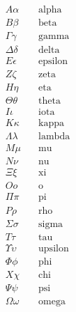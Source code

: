 \documentclass[11pt]{report}
\theoremstyle{definition}
\begin{document}
\[
	\begin{split}
		A        \alpha   & \quad \text{alpha}   \\
		B        \beta    & \quad \text{beta}    \\
		\Gamma   \gamma   & \quad \text{gamma}   \\
		\Delta   \delta   & \quad \text{delta}   \\
		E        \epsilon & \quad \text{epsilon} \\
		Z        \zeta    & \quad \text{zeta}    \\
		H        \eta     & \quad \text{eta}     \\
		\Theta   \theta   & \quad \text{theta}   \\
		I        \iota    & \quad \text{iota}    \\
		K        \kappa   & \quad \text{kappa}   \\
		\Lambda  \lambda  & \quad \text{lambda}  \\
		M        \mu      & \quad \text{mu}      \\
		N        \nu      & \quad \text{nu}      \\
		\Xi      \xi      & \quad \text{xi}      \\
		O        o        & \quad \text{o}       \\
		\Pi      \pi      & \quad \text{pi}      \\
		P        \rho     & \quad \text{rho}     \\
		\Sigma   \sigma   & \quad \text{sigma}   \\
		T        \tau     & \quad \text{tau}     \\
		\Upsilon \upsilon & \quad \text{upsilon} \\
		\Phi     \phi     & \quad \text{phi}     \\
		X        \chi     & \quad \text{chi}     \\
		\Psi     \psi     & \quad \text{psi}     \\
		\Omega   \omega   & \quad \text{omega}   \\
	\end{split}
\]
\end{document}
